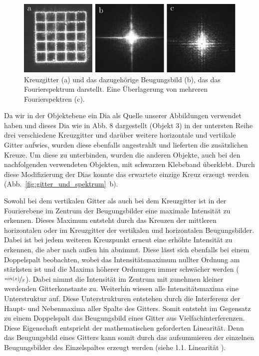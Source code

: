 \begin{figure}[ht]
	\centering
	\includegraphics{images/Regina/abb14.pdf}
	\caption[Kreuzgitter mit Fourierspektrum]{
		Kreuzgitter (a) und das dazugehörige Beugungsbild (b), das das Fourierspektrum darstellt. Eine Überlagerung von mehreren Fourierspektren (c).
	}
	\label{fig:kreuzgitter_und_spektrum}
\end{figure}

Da wir in der Objektebene ein Dia als Quelle unserer Abbildungen verwendet haben und dieses Dia wie in Abb. 8%
 dargestellt (Objekt 3) in der untersten Reihe drei verschiedene Kreuzgitter und darüber weitere horizontale und vertikale Gitter aufwies, wurden diese ebenfalls angestrahlt und lieferten die zusätzlichen Kreuze. Um diese zu unterbinden, wurden die anderen Objekte, auch bei den nachfolgenden verwendeten Objekten, mit schwarzen Klebeband überklebt. Durch diese Modifizierung der Dias konnte das erwartete einzige Kreuz erzeugt werden (Abb.~\ref{fig:gitter_und_spektrum}~b).

Sowohl bei dem vertikalen Gitter als auch bei dem Kreuzgitter ist in der Fourierebene im Zentrum der Beugungsbilder eine maximale Intensität zu erkennen. Dieses Maximum entsteht durch das Kreuzen der mittleren horizontalen oder im Kreuzgitter der vertikalen und
horizontalen Beugungsbilder. Dabei ist bei jedem weiteren Kreuzpunkt erneut eine erhöhte Intensität zu erkennen, die aber nach außen hin abnimmt. Diese lässt sich ebenfalls bei einem
Doppelspalt beobachten, wobei das Intensitätsmaximum nullter Ordnung am stärksten ist und die Maxima höherer Ordnungen immer schwächer werden ($\nicefrac{sin(x)}{x}$). Dabei nimmt die Intensität im Zentrum mit zunehmen kleiner werdenden Gitterkonstante zu.
Weiterhin wiesen alle Intensitätsmaxima eine Unterstruktur auf. Diese Unterstrukturen entstehen durch die Interferenz der Haupt- und Nebenmaxima aller Spalte des Gitters. Somit entsteht im Gegensatz zu einem Doppelspalt das Beugungsbild eines Gitter aus Vielfachinterferenzen. Diese Eigenschaft entspricht der mathematischen geforderten Linearität. Denn das Beugungsbild eines Gitters kann somit durch das aufsummieren der einzelnen Beugungsbilder des Einzelspaltes erzeugt werden (siehe 1.1. Linearität%
).

